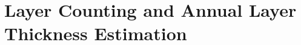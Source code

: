 \documentclass[11pt]{memoir}
\begin{document}



\chapter[Layer Counting][Layer Counting]{Layer Counting and Annual Layer Thickness Estimation}



\backmatter

 



\end{document}

